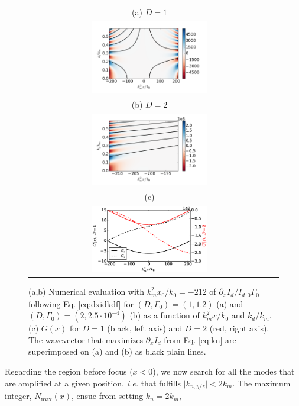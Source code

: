 \documentclass[
 reprint,
 amsmath,amssymb,
 aps,
]{revtex4-1}
\begin{document}
\begin{figure}[!]
\begin{tabular}{cc}
(a) $D=1$\\
\includegraphics[width=0.49\textwidth]{gkx_2d_2mm.png}\\
(b) $D=2$\\
\includegraphics[width=0.49\textwidth]{gkx_2d_2mm_D2.png}\\
(c)\\
\includegraphics[width=0.49\textwidth]{G_2d_2mm.eps}
\end{tabular}
\caption{ \label{fig:gxk}
(a,b) Numerical evaluation with $k_m^2x_0/k_0 = -212$ of $\partial_x I_d /I_{d,0}\Gamma_0$ following Eq. \eqref{eq:dxidkdf} for $(D,\Gamma_0)=(1,1.2)$ (a) and $(D,\Gamma_0)=(2,2.5\cdot 10^{-4} )$ (b) as a function of $k_m^2x/k_0$ and $k_d/k_m$.
(c) $G(x)$ for $D=1$ (black, left axis) and $D=2$ (red, right axis).
The wavevector that maximizes $\partial_x I_d$  from Eq. \eqref{eq:kn} are superimposed on (a) and (b) as black plain lines.
 }
\end{figure}
Regarding the region before focus ($x<0$), we now search for all the  modes that are amplified at a given position, \emph{i.e.} that fulfills $\vert k_{n,y/z}\vert <2k_m$. 
The maximum integer, $N_\mathrm{max}(x)$, ensue from setting  $k_n=2k_m$,
\end{document}
